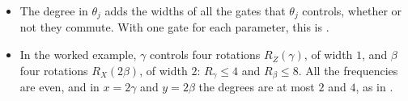 \documentclass[handoutsbeamer.tex]{subfiles}
\begin{document}
\begin{frame}
\onp{\footnotesize}
\begin{itemize}\setlength\itemsep{0.3em}
    \item The degree in $\theta_j$ adds the widths of all the gates that $\theta_j$ controls, whether or not they commute. With one gate for each parameter, this is .
    \item In the worked example, $\gamma$ controls four rotations $R_Z(\gamma)$, of width $1$, and $\beta$ four rotations $R_X(2\beta)$, of width $2$: $R_\gamma\le4$ and $R_\beta\le8$. All the frequencies are even, and in $x = 2\gamma$ and $y = 2\beta$ the degrees are at most $2$ and $4$, as in .
\end{itemize}
\end{frame}
\end{document}
